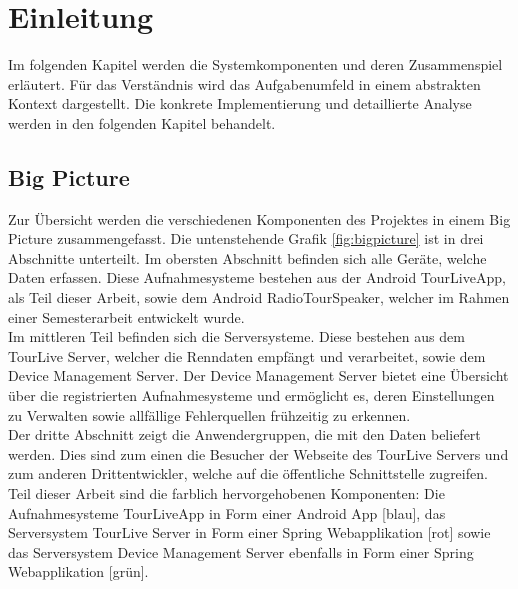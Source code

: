 \chapter{Einleitung}

Im folgenden Kapitel werden die Systemkomponenten und deren Zusammenspiel erläutert. Für das Verständnis wird das Aufgabenumfeld in einem abstrakten Kontext dargestellt. Die konkrete Implementierung und detaillierte Analyse werden in den folgenden Kapitel behandelt.

\section{Big Picture}
Zur Übersicht werden die verschiedenen Komponenten des Projektes in einem Big Picture zusammengefasst. Die untenstehende Grafik \ref{fig:bigpicture} ist in drei Abschnitte unterteilt. Im obersten Abschnitt befinden sich alle Geräte, welche Daten erfassen. Diese Aufnahmesysteme bestehen aus der Android TourLiveApp, als Teil dieser Arbeit, sowie dem Android RadioTourSpeaker,  welcher im Rahmen einer Semesterarbeit \cite{radiotourspeaker2012} entwickelt wurde.\\

Im mittleren Teil befinden sich die Serversysteme. Diese bestehen aus dem TourLive Server, welcher die Renndaten empfängt und verarbeitet, sowie dem Device Management Server. Der Device Management Server bietet eine Übersicht über die registrierten Aufnahmesysteme und ermöglicht es, deren Einstellungen zu Verwalten sowie allfällige Fehlerquellen frühzeitig zu erkennen.\\

Der dritte Abschnitt zeigt die Anwendergruppen, die mit den Daten beliefert werden. Dies sind zum einen die Besucher der Webseite des TourLive Servers und zum anderen Drittentwickler, welche auf die öffentliche Schnittstelle zugreifen.\\

Teil dieser Arbeit sind die farblich hervorgehobenen Komponenten: Die Aufnahmesysteme TourLiveApp in Form einer Android App [blau], das Serversystem TourLive Server in Form einer Spring Webapplikation [rot] sowie das Serversystem Device Management Server ebenfalls in Form einer Spring Webapplikation [grün].

